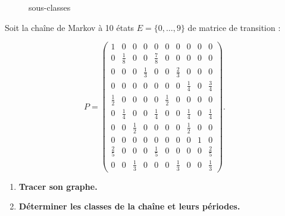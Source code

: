 \begin{enumerate}
\begin{figure}[h!]
    \caption{sous-classes}
\end{figure}
\end{enumerate}



\begin{exercise}[7.3]
Soit la chaîne de Markov à 10 états $E = \{0, \dots, 9\}$ de matrice de transition :

\[
P =
\begin{pmatrix}
1 & 0 & 0 & 0 & 0 & 0 & 0 & 0 & 0 & 0 \\
0 & \frac{1}{8} & 0 & 0 & \frac{7}{8} & 0 & 0 & 0 & 0 & 0 \\
0 & 0 & 0 & \frac{1}{3} & 0 & 0 & \frac{2}{3} & 0 & 0 & 0 \\
0 & 0 & 0 & 0 & 0 & 0 & 0 & \frac{1}{4} & 0 & \frac{3}{4} \\
\frac{1}{2} & 0 & 0 & 0 & 0 & \frac{1}{2} & 0 & 0 & 0 & 0 \\
0 & \frac{1}{4} & 0 & 0 & \frac{1}{4} & 0 & 0 & \frac{1}{4} & 0 & \frac{1}{4} \\
0 & 0 & \frac{1}{2} & 0 & 0 & 0 & 0 & \frac{1}{2} & 0 & 0 \\
0 & 0 & 0 & 0 & 0 & 0 & 0 & 0 & 1 & 0 \\
\frac{2}{5} & 0 & 0 & 0 & \frac{1}{5} & 0 & 0 & 0 & 0 & \frac{2}{5} \\
0 & 0 & \frac{1}{3} & 0 & 0 & 0 & \frac{1}{3} & 0 & 0 & \frac{1}{3}
\end{pmatrix}.
\]

\begin{enumerate}
    \item \textbf{Tracer son graphe.}
    \item \textbf{Déterminer les classes de la chaîne et leurs périodes.}
\end{enumerate}
\end{exercise}

